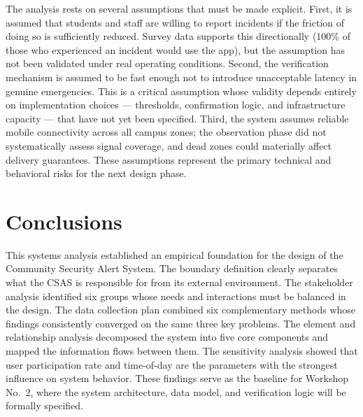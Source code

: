 \documentclass[12pt, onecolumn]{IEEEtran}
\begin{document}
The analysis rests on several assumptions that must be made explicit.
First, it is assumed that students and staff are willing to report
incidents if the friction of doing so is sufficiently reduced. Survey
data supports this directionally (100\% of those who experienced an
incident would use the app), but the assumption has not been validated
under real operating conditions. Second, the verification mechanism is
assumed to be fast enough not to introduce unacceptable latency in
genuine emergencies. This is a critical assumption whose validity
depends entirely on implementation choices --- thresholds, confirmation
logic, and infrastructure capacity --- that have not yet been specified.
Third, the system assumes reliable mobile connectivity across all
campus zones; the observation phase did not systematically assess
signal coverage, and dead zones could materially affect delivery
guarantees. These assumptions represent the primary technical and
behavioral risks for the next design phase.

\section{Conclusions}

This systems analysis established an empirical foundation for the design
of the Community Security Alert System. The boundary definition clearly
separates what the CSAS is responsible for from its external environment.
The stakeholder analysis identified six groups whose needs and
interactions must be balanced in the design. The data collection plan
combined six complementary methods whose findings consistently converged
on the same three key problems. The element and relationship analysis
decomposed the system into five core components and mapped the
information flows between them. The sensitivity analysis showed that
user participation rate and time-of-day are the parameters with the
strongest influence on system behavior. These findings serve as the
baseline for Workshop No.~2, where the system architecture, data model,
and verification logic will be formally specified.
\end{document}
